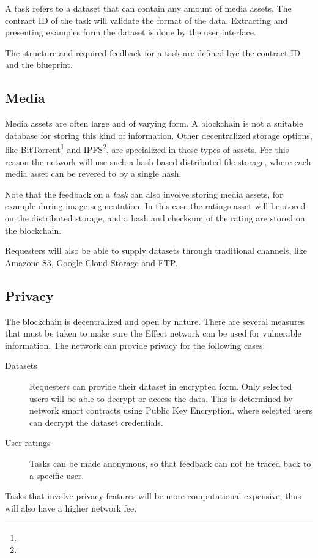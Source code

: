 \documentclass{article}
\begin{document}
A task refers to a dataset that can contain any amount of media
assets. The contract ID of the task will validate the format of the
data. Extracting and presenting examples form the dataset is done by
the user interface.

The structure and required feedback for a task are defined bye the
contract ID and the blueprint.

\subsection{Media}
Media assets are often large and of varying form. A blockchain is not
a suitable database for storing this kind of information. Other
decentralized storage options, like BitTorrent\footnote{} and
IPFS\footnote{}, are specialized in these types of assets. For this
reason the network will use such a hash-based distributed file
storage, where each media asset can be revered to by a single hash.

Note that the feedback on a \emph{task} can also involve storing media
assets, for example during image segmentation. In this case the
ratings asset will be stored on the distributed storage, and a hash
and checksum of the rating are stored on the blockchain.

Requesters will also be able to supply datasets through traditional
channels, like Amazone S3, Google Cloud Storage and FTP.

\subsection{Privacy}
The blockchain is decentralized and open by nature. There are several
measures that must be taken to make sure the Effect network can be
used for vulnerable information. The network can provide privacy for
the following cases:

\begin{description}
\item[Datasets] Requesters can provide their dataset in encrypted
  form. Only selected users will be able to decrypt or access the
  data. This is determined by network smart contracts using Public Key
  Encryption, where selected users can decrypt the dataset
  credentials.
\item[User ratings] Tasks can be made anonymous, so that feedback can
  not be traced back to a specific user.
\end{description}

Tasks that involve privacy features will be more computational
expensive, thus will also have a higher network fee.
\end{document}
